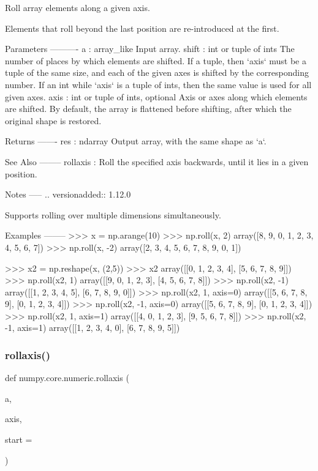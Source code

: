 \begin{DoxyVerb}Roll array elements along a given axis.

Elements that roll beyond the last position are re-introduced at
the first.

Parameters
----------
a : array_like
    Input array.
shift : int or tuple of ints
    The number of places by which elements are shifted.  If a tuple,
    then `axis` must be a tuple of the same size, and each of the
    given axes is shifted by the corresponding number.  If an int
    while `axis` is a tuple of ints, then the same value is used for
    all given axes.
axis : int or tuple of ints, optional
    Axis or axes along which elements are shifted.  By default, the
    array is flattened before shifting, after which the original
    shape is restored.

Returns
-------
res : ndarray
    Output array, with the same shape as `a`.

See Also
--------
rollaxis : Roll the specified axis backwards, until it lies in a
           given position.

Notes
-----
.. versionadded:: 1.12.0

Supports rolling over multiple dimensions simultaneously.

Examples
--------
>>> x = np.arange(10)
>>> np.roll(x, 2)
array([8, 9, 0, 1, 2, 3, 4, 5, 6, 7])
>>> np.roll(x, -2)
array([2, 3, 4, 5, 6, 7, 8, 9, 0, 1])

>>> x2 = np.reshape(x, (2,5))
>>> x2
array([[0, 1, 2, 3, 4],
       [5, 6, 7, 8, 9]])
>>> np.roll(x2, 1)
array([[9, 0, 1, 2, 3],
       [4, 5, 6, 7, 8]])
>>> np.roll(x2, -1)
array([[1, 2, 3, 4, 5],
       [6, 7, 8, 9, 0]])
>>> np.roll(x2, 1, axis=0)
array([[5, 6, 7, 8, 9],
       [0, 1, 2, 3, 4]])
>>> np.roll(x2, -1, axis=0)
array([[5, 6, 7, 8, 9],
       [0, 1, 2, 3, 4]])
>>> np.roll(x2, 1, axis=1)
array([[4, 0, 1, 2, 3],
       [9, 5, 6, 7, 8]])
>>> np.roll(x2, -1, axis=1)
array([[1, 2, 3, 4, 0],
       [6, 7, 8, 9, 5]])\end{DoxyVerb}
 \mbox{\label{namespacenumpy_1_1core_1_1numeric_a644e0d45bac850ac24fee58dc9f0d5cb}} 
\subsubsection{\texorpdfstring{rollaxis()}{rollaxis()}}
{\footnotesize\ttfamily def numpy.\+core.\+numeric.\+rollaxis (\begin{DoxyParamCaption}\item[{}]{a,  }\item[{}]{axis,  }\item[{}]{start = {} }\end{DoxyParamCaption})}

